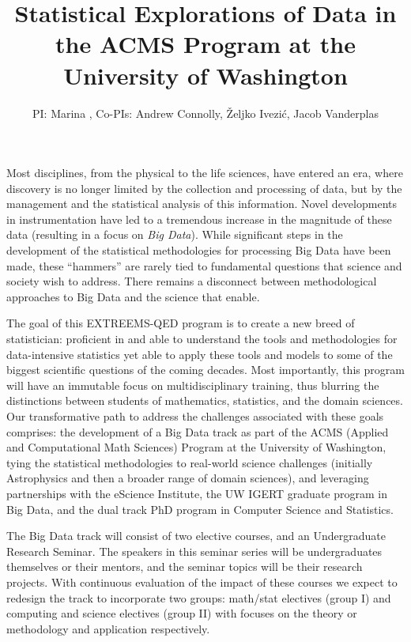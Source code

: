 \documentclass[nofootbib,floatfix,11pt]{article}
\title{Statistical Explorations of Data in the {ACMS} {Program} at the
  {University} of {Washington}}
\author{PI: Marina \meila, Co-PIs: Andrew Connolly, \v{Z}eljko Ivezi\'{c}, Jacob Vanderplas}
\begin{document}

Most disciplines, from the physical to the life sciences, have entered
an era, where discovery is no longer limited by the collection and
processing of data, but by the management and the statistical analysis
of this information. Novel developments in instrumentation have led to
a tremendous increase in the magnitude of these data (resulting in a
focus on \emph{Big Data}).  While significant steps in the development
of the statistical methodologies for processing Big Data have been
made, these ``hammers'' are rarely tied to fundamental questions that
science and society wish to address. There remains a disconnect
between methodological approaches to Big Data and the science that
enable.


The goal of this EXTREEMS-QED program is to create a new breed of
statistician: proficient in and able to understand the tools and
methodologies for data-intensive statistics yet able to apply these
tools and models to some of the biggest scientific questions of the
coming decades.  Most importantly, this program will have an immutable
focus on multidisciplinary training, thus blurring the distinctions
between students of mathematics, statistics, and the domain sciences.
Our transformative path to address the challenges associated with
these goals comprises: the development of a Big Data track as part of
the ACMS (Applied and Computational Math Sciences) Program at the
University of Washington, tying the statistical methodologies to
real-world science challenges (initially Astrophysics and then a
broader range of domain sciences), and leveraging partnerships with
the eScience Institute, the UW IGERT graduate program in Big Data, and
the dual track PhD program in Computer Science and Statistics.

The Big Data track will consist of two elective courses, and an
Undergraduate  Research Seminar. The speakers in this seminar
series will be undergraduates themselves or their mentors, and the
seminar topics will be their research projects. With continuous
evaluation of the impact of these courses we expect to redesign the
track to incorporate two groups: math/stat electives (group I) and
computing and science electives (group II) with focuses on the theory
or methodology and application respectively.
\end{document}
